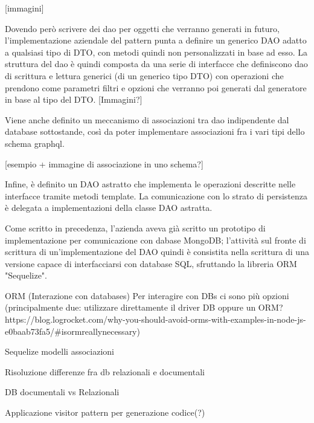         [immagini]

        Dovendo però scrivere dei dao per oggetti che verranno generati in futuro, l'implementazione aziendale del pattern punta a definire un generico DAO adatto a qualsiasi tipo di DTO, con metodi quindi non personalizzati in base ad esso.
        La struttura del dao è quindi composta da una serie di interfacce che definiscono dao di scrittura e lettura generici (di un generico tipo DTO) con operazioni che prendono come parametri filtri e opzioni che verranno poi generati dal generatore in base al tipo del DTO.
        [Immagini?]
        
        Viene anche definito un meccanismo di associazioni tra dao indipendente dal database sottostande, così da poter implementare associazioni fra i vari tipi dello schema graphql.

        [esempio + immagine di associazione in uno schema?]

        Infine, è definito un DAO astratto che implementa le operazioni descritte nelle interfacce tramite metodi template.
        La comunicazione con lo strato di persistenza è delegata a implementazioni della classe DAO astratta.

        Come scritto in precedenza, l'azienda aveva già scritto un prototipo di implementazione per comunicazione con dabase MongoDB; l'attività sul fronte di scrittura di un'implementazione del DAO quindi è consistita nella scrittura di una versione capace di interfacciarsi con database SQL, sfruttando la libreria ORM "Sequelize".

    
       
    ORM (Interazione con databases)
        Per interagire con DBs ci sono più opzioni (principalmente due: utilizzare direttamente il driver DB oppure un ORM? https://blog.logrocket.com/why-you-should-avoid-orms-with-examples-in-node-js-e0baab73fa5/#isormreallynecessary) 
        
        Sequelize
        modelli
        associazioni
        
    Risoluzione differenze fra db relazionali e documentali
    
    DB documentali vs Relazionali

    Applicazione visitor pattern per generazione codice(?)


